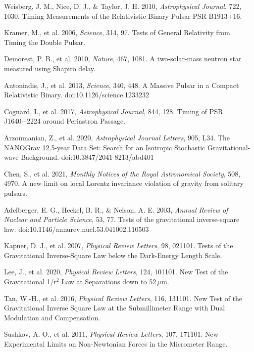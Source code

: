 \documentclass[12pt,a4paper]{article}
\begin{document}
\begin{thebibliography}{99}
 Weisberg, J. M., Nice, D. J., \& Taylor, J. H. 2010, \textit{Astrophysical Journal}, 722, 1030. Timing Measurements of the Relativistic Binary Pulsar PSR B1913+16.

 Kramer, M., et al. 2006, \textit{Science}, 314, 97. Tests of General Relativity from Timing the Double Pulsar.

 Demorest, P. B., et al. 2010, \textit{Nature}, 467, 1081. A two-solar-mass neutron star measured using Shapiro delay.

 Antoniadis, J., et al. 2013, \textit{Science}, 340, 448. A Massive Pulsar in a Compact Relativistic Binary. doi:10.1126/science.1233232

 Cognard, I., et al. 2017, \textit{Astrophysical Journal}, 844, 128. Timing of PSR J1640+2224 around Periastron Passage.

 Arzoumanian, Z., et al. 2020, \textit{Astrophysical Journal Letters}, 905, L34. The NANOGrav 12.5-year Data Set: Search for an Isotropic Stochastic Gravitational-wave Background. doi:10.3847/2041-8213/abd401

 Chen, S., et al. 2021, \textit{Monthly Notices of the Royal Astronomical Society}, 508, 4970. A new limit on local Lorentz invariance violation of gravity from solitary pulsars.

 Adelberger, E. G., Heckel, B. R., \& Nelson, A. E. 2003, \textit{Annual Review of Nuclear and Particle Science}, 53, 77. Tests of the gravitational inverse-square law. doi:10.1146/annurev.nucl.53.041002.110503

 Kapner, D. J., et al. 2007, \textit{Physical Review Letters}, 98, 021101. Tests of the Gravitational Inverse-Square Law below the Dark-Energy Length Scale.

 Lee, J., et al. 2020, \textit{Physical Review Letters}, 124, 101101. New Test of the Gravitational 1/r$^2$ Law at Separations down to 52\,$\mu$m.

 Tan, W.-H., et al. 2016, \textit{Physical Review Letters}, 116, 131101. New Test of the Gravitational Inverse Square Law at the Submillimeter Range with Dual Modulation and Compensation.

 Sushkov, A. O., et al. 2011, \textit{Physical Review Letters}, 107, 171101. New Experimental Limits on Non-Newtonian Forces in the Micrometer Range.


\end{thebibliography}
\end{document}
